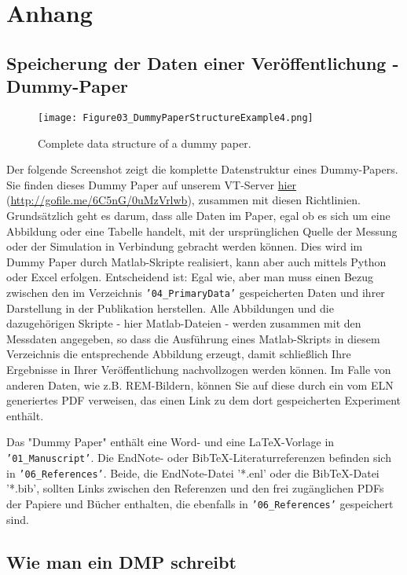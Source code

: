 \pagebreak
\section{Anhang}
\subsection{Speicherung der Daten einer Veröffentlichung -
            \glqq Dummy-Paper\grqq{}}\label{app:dummy-paper}
\begin{wrapfigure}{r}{0.5\linewidth}
  \vspace{-1em}
  \texttt{[image: Figure03\_DummyPaperStructureExample4.png]}
  \caption{Complete data structure of a dummy paper.}
  \label{fig:dummy-paper}
\end{wrapfigure}
Der folgende Screenshot zeigt die komplette Datenstruktur eines Dummy-Papers.
Sie finden dieses Dummy Paper auf unserem VT-Server
\href{http://gofile.me/6C5nG/0uMzVrlwb}{hier}
(\url{http://gofile.me/6C5nG/0uMzVrlwb}),
zusammen mit diesen Richtlinien. Grundsätzlich geht es darum, dass alle Daten im
Paper, egal ob es sich um eine Abbildung oder eine Tabelle handelt, mit der
ursprünglichen Quelle der Messung oder der Simulation in Verbindung gebracht
werden können. Dies wird im Dummy Paper durch Matlab-Skripte realisiert, kann
aber auch mittels Python oder Excel erfolgen. Entscheidend ist: Egal wie, aber
man muss einen Bezug zwischen den im Verzeichnis \texttt{'04\_PrimaryData'}
gespeicherten Daten und ihrer Darstellung in der Publikation herstellen. Alle
Abbildungen und die dazugehörigen Skripte - hier Matlab-Dateien - werden
zusammen mit den Messdaten angegeben, so dass die Ausführung eines
Matlab-Skripts in diesem Verzeichnis die entsprechende Abbildung erzeugt, damit
schließlich Ihre Ergebnisse in Ihrer Veröffentlichung nachvollzogen werden
können. Im Falle von anderen Daten, wie z.B. REM-Bildern, können Sie auf diese
durch ein vom ELN generiertes PDF verweisen, das einen Link zu dem dort
gespeicherten Experiment enthält.

Das "Dummy Paper" enthält eine Word- und eine LaTeX-Vorlage in
\texttt{'01\_Manuscript'}. Die EndNote- oder BibTeX-Literaturreferenzen
befinden sich in \texttt{'06\_References'}. Beide, die EndNote-Datei '*.enl'
oder die BibTeX-Datei '*.bib', sollten Links zwischen den Referenzen und den
frei zugänglichen PDFs der Papiere und Bücher enthalten, die ebenfalls in
\texttt{'06\_References'} gespeichert sind.

\subsection{Wie man ein DMP schreibt}

